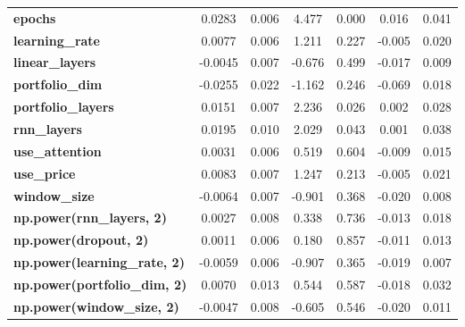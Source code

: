 \begin{center}
\begin{tabular}{lcccccc}
\textbf{epochs}                            &       0.0283  &        0.006     &     4.477  &         0.000        &        0.016    &        0.041     \\
\textbf{learning\_rate}                    &       0.0077  &        0.006     &     1.211  &         0.227        &       -0.005    &        0.020     \\
\textbf{linear\_layers}                    &      -0.0045  &        0.007     &    -0.676  &         0.499        &       -0.017    &        0.009     \\
\textbf{portfolio\_dim}                    &      -0.0255  &        0.022     &    -1.162  &         0.246        &       -0.069    &        0.018     \\
\textbf{portfolio\_layers}                 &       0.0151  &        0.007     &     2.236  &         0.026        &        0.002    &        0.028     \\
\textbf{rnn\_layers}                       &       0.0195  &        0.010     &     2.029  &         0.043        &        0.001    &        0.038     \\
\textbf{use\_attention}                    &       0.0031  &        0.006     &     0.519  &         0.604        &       -0.009    &        0.015     \\
\textbf{use\_price}                        &       0.0083  &        0.007     &     1.247  &         0.213        &       -0.005    &        0.021     \\
\textbf{window\_size}                      &      -0.0064  &        0.007     &    -0.901  &         0.368        &       -0.020    &        0.008     \\
\textbf{np.power(rnn\_layers, 2)}          &       0.0027  &        0.008     &     0.338  &         0.736        &       -0.013    &        0.018     \\
\textbf{np.power(dropout, 2)}              &       0.0011  &        0.006     &     0.180  &         0.857        &       -0.011    &        0.013     \\
\textbf{np.power(learning\_rate, 2)}       &      -0.0059  &        0.006     &    -0.907  &         0.365        &       -0.019    &        0.007     \\
\textbf{np.power(portfolio\_dim, 2)}       &       0.0070  &        0.013     &     0.544  &         0.587        &       -0.018    &        0.032     \\
\textbf{np.power(window\_size, 2)}         &      -0.0047  &        0.008     &    -0.605  &         0.546        &       -0.020    &        0.011     \\

\end{tabular}
\end{center}
